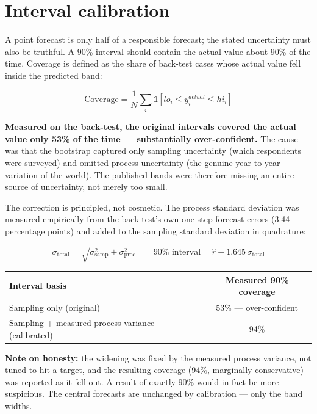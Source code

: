 \documentclass[ %
                    author={Ashrey Ashrey, Sanya Kapoor, Trisha Sharma, Yash Bhooshan Pandloskar},
                supervisor={Dr. Dalila O’Grady},
                    degree={MSc},
                     title={Using machine learning to forecast physical activity participation, volunteering and activity patterns in London},
                  subtitle={},
                      type={},
                      year={2021}]{dissertation}
\begin{document}
\section{Interval calibration}

\noindent
A point forecast is only half of a responsible forecast; the stated uncertainty must also be truthful. A 90\% interval should contain the actual value about 90\% of the time. Coverage is defined as the share of back-test cases whose actual value fell inside the predicted band:

\[
\mathrm{Coverage}
=
\frac{1}{N}
\sum_i
\mathbb{1}
\left[
lo_i \leq y_i^{actual} \leq hi_i
\right]
\]

\noindent
\textbf{Measured on the back-test, the original intervals covered the actual value only 53\% of the time --- substantially over-confident.} The cause was that the bootstrap captured only sampling uncertainty (which respondents were surveyed) and omitted process uncertainty (the genuine year-to-year variation of the world). The published bands were therefore missing an entire source of uncertainty, not merely too small.

The correction is principled, not cosmetic. The process standard deviation was measured empirically from the back-test's own one-step forecast errors (3.44 percentage points) and added to the sampling standard deviation in quadrature:

\[
\sigma_{\mathrm{total}}
=
\sqrt{\sigma_{\mathrm{samp}}^2+\sigma_{\mathrm{proc}}^2}
\qquad
90\% \text{ interval}
=
\hat{r}
\pm
1.645\,\sigma_{\mathrm{total}}
\]

\begin{table}[!htb]
\centering
\begin{tabular}{lc}
\toprule
\textbf{Interval basis} & \textbf{Measured 90\% coverage} \\
\midrule
Sampling only (original) & 53\% --- over-confident \\
Sampling + measured process variance (calibrated) & 94\% \\
\bottomrule
\end{tabular}
\end{table}

\noindent
\textbf{Note on honesty:} the widening was fixed by the measured process variance, not tuned to hit a target, and the resulting coverage (94\%, marginally conservative) was reported as it fell out. A result of exactly 90\% would in fact be more suspicious. The central forecasts are unchanged by calibration --- only the band widths.
\end{document}
